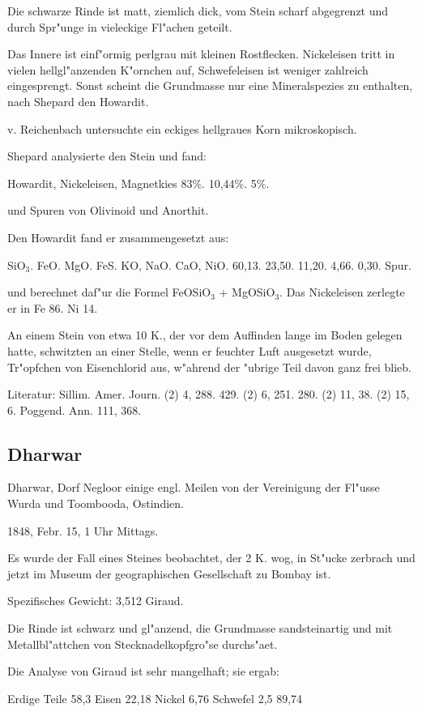 \documentclass[a4paper, 11pt, oneside]{article}
\begin{document}
Die schwarze Rinde ist matt, ziemlich dick, vom Stein scharf abgegrenzt und durch Spr"unge in vieleckige Fl"achen geteilt.

Das Innere ist einf"ormig perlgrau mit kleinen Rostflecken. Nickeleisen tritt in vielen hellgl"anzenden K"ornchen auf, Schwefeleisen ist weniger zahlreich eingesprengt. Sonst scheint die Grundmasse nur eine Mineralspezies zu enthalten, nach Shepard den Howardit.

v. Reichenbach untersuchte ein eckiges hellgraues Korn mikroskopisch.

Shepard analysierte den Stein und fand:

Howardit, Nickeleisen, Magnetkies  
83\%. 10,44\%. 5\%.

und Spuren von Olivinoid und Anorthit.

Den Howardit fand er zusammengesetzt aus:

SiO$_{3}$. FeO. MgO. FeS. KO, NaO. CaO, NiO.  
60,13. 23,50. 11,20. 4,66. 0,30. Spur.

und berechnet daf"ur die Formel FeOSiO$_{3}$ + MgOSiO$_{3}$. Das Nickeleisen zerlegte er in Fe 86. Ni 14.

An einem Stein von etwa 10 K., der vor dem Auffinden lange im Boden gelegen hatte, schwitzten an einer Stelle, wenn er feuchter Luft ausgesetzt wurde, Tr"opfchen von Eisenchlorid aus, w"ahrend der "ubrige Teil davon ganz frei blieb.

Literatur: Sillim. Amer. Journ. (2) 4, 288. 429. (2) 6, 251. 280. (2) 11, 38. (2) 15, 6. Poggend. Ann. 111, 368.

\subsection{Dharwar}

Dharwar, Dorf Negloor einige engl. Meilen von der Vereinigung der Fl"usse Wurda und Toombooda, Ostindien.

1848, Febr. 15, 1 Uhr Mittags.

Es wurde der Fall eines Steines beobachtet, der 2 K. wog, in St"ucke zerbrach und jetzt im Museum der geographischen Gesellschaft zu Bombay ist.

Spezifisches Gewicht: 3,512 Giraud.

Die Rinde ist schwarz und gl"anzend, die Grundmasse sandsteinartig und mit Metallbl"attchen von Stecknadelkopfgro"se durchs"aet.

Die Analyse von Giraud ist sehr mangelhaft; sie ergab:

Erdige Teile 58,3  
Eisen 22,18  
Nickel 6,76  
Schwefel 2,5  
89,74
\end{document}

